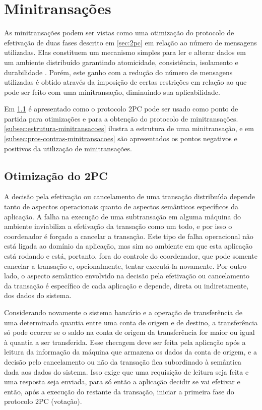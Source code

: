 \documentclass[11pt,twoside,a4paper]{book}
\begin{document}
\section{Minitransações}
\label{sec:minitransacoes}
As minitransações podem ser vistas como uma otimização do protocolo de efetivação de duas fases descrito em \ref{sec:2pc} em relação ao número de mensagens utilizadas. Elas constituem um mecanismo simples para ler e alterar dados em um ambiente distribuído garantindo atomicidade, consistência, isolamento e durabilidade \cite{sinfonia}. Porém, este ganho com a redução do número de mensagens utilizadas é obtido através da imposição de certas restrições em relação ao que pode ser feito com uma minitransação, diminuindo sua aplicabilidade.

Em \ref{subsec:derivando-minitransacoes} é apresentado como o protocolo 2PC pode ser usado como ponto de partida para otimizações e para a obtenção do protocolo de minitransações. \ref{subsec:estrutura-minitransacoes} ilustra a estrutura de uma minitransação, e em \ref{subsec:pros-contras-minitransacoes} são apresentados os pontos negativos e positivos da utilização de minitransações.

\subsection{Otimização do 2PC}
\label{subsec:derivando-minitransacoes}
A decisão pela efetivação ou cancelamento de uma transação distribuída depende tanto de aspectos operacionais quanto de aspectos semânticos específicos da aplicação. A falha na execução de uma subtransação em alguma máquina do ambiente inviabiliza a efetivação da transação como um todo, e por isso o coordenador é forçado a cancelar a transação. Este tipo de falha operacional não está ligada ao domínio da aplicação, mas sim ao ambiente em que esta aplicação está rodando e está, portanto, fora do controle do coordenador, que pode somente cancelar a transação e, opcionalmente, tentar executá-la novamente. Por outro lado, o aspecto semântico envolvido na decisão pela efetivação ou cancelamento da transação é específico de cada aplicação e depende, direta ou indiretamente, dos dados do sistema.

Considerando novamente o sistema bancário e a operação de transferência de uma determinada quantia entre uma conta de origem e de destino, a transferência só pode ocorrer se o saldo na conta de origem da transferência for maior ou igual à quantia a ser transferida. Esse checagem deve ser feita pela aplicação após a leitura da informação da máquina que armazena os dados da conta de origem, e a decisão pelo cancelamento ou não da transação fica subordinado à semântica dada aos dados do sistema. Isso exige que uma requisição de leitura seja feita e uma resposta seja enviada, para só então a aplicação decidir se vai efetivar e então, após a execução do restante da transação, iniciar a primeira fase do protocolo 2PC (votação).
\end{document}
